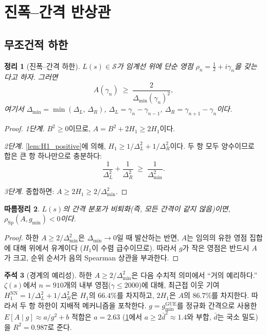 \documentclass[11pt,a4paper]{article}
\theoremstyle{plain}
\newtheorem{theorem}{정리}[section]
\newtheorem{corollary}[theorem]{따름정리}
\theoremstyle{definition}
\newtheorem{remark}[theorem]{주석}
\begin{document}
\section{진폭--간격 반상관}
\label{sec:theorem}

\subsection{무조건적 하한}

\begin{theorem}[진폭--간격 하한]\label{thm:lower_bound}
$L(s) \in \mathcal{S}$가 임계선 위에 단순 영점
$\rho_n = \tfrac{1}{2} + i\gamma_n$을 갖는다고 하자. 그러면
\begin{equation}\label{eq:lower_bound}
  A(\gamma_n) \;\ge\; \frac{2}{\Delta_{\min}(\gamma_n)^2},
\end{equation}
여기서 $\Delta_{\min} = \min(\Delta_L,\,\Delta_R)$,
$\Delta_L = \gamma_n - \gamma_{n-1}$, $\Delta_R = \gamma_{n+1} - \gamma_n$이다.
\end{theorem}

\begin{proof}
\textit{1단계.}\;
$B^2 \ge 0$이므로,
$A = B^2 + 2H_1 \ge 2H_1$이다.

\smallskip\noindent\textit{2단계.}\;
\cref{lem:H1_positive}에 의해,
$H_1 \ge 1/\Delta_L^2 + 1/\Delta_R^2$이다.
두 항 모두 양수이므로 합은 큰 항 하나만으로 충분하다:
\[
  \frac{1}{\Delta_L^2} + \frac{1}{\Delta_R^2}
  \;\ge\; \frac{1}{\Delta_{\min}^2}.
\]

\smallskip\noindent\textit{3단계.}\;
종합하면: $A \ge 2H_1 \ge 2/\Delta_{\min}^2$.
\end{proof}

\begin{corollary}\label{cor:anticorrelation}
$L(s)$의 간격 분포가 비퇴화(즉, 모든 간격이 같지 않음)이면,
$\rho_{\mathrm{Sp}}(A, g_{\min}) < 0$이다.
\end{corollary}

\begin{proof}
하한 $A \ge 2/\Delta_{\min}^2$은 $\Delta_{\min} \to 0$일 때 발산하는 반면,
$A$는 임의의 유한 영점 집합에 대해 위에서 유계이다
($H_1$이 수렴 급수이므로).
따라서 $g$가 작은 영점은 반드시 $A$가 크고,
순위 순서가 음의 Spearman 상관을 부과한다.
\end{proof}

\begin{remark}[경계의 예리성]\label{rem:tightness}
하한 $A \ge 2/\Delta_{\min}^2$은 다음 수치적 의미에서 ``거의 예리하다.''
$\zeta(s)$에서 $n = 910$개의 내부 영점($\gamma \le 2000$)에 대해,
최근접 이웃 기여
$H_1^{\mathrm{NN}} = 1/\Delta_L^2 + 1/\Delta_R^2$은
$H_1$의 $66.4\%$를 차지하고, $2H_1$은 $A$의 $86.7\%$를 차지한다.
따라서 두 항 하한이 지배적 메커니즘을 포착한다.
$g = g_{\min}^{\mathrm{GUE}}$를 정규화 간격으로 사용한
$E[A \mid g] \approx a/g^2 + b$ 적합은 $a = 2.63$
(\cref{thm:lower_bound}에서 $a \ge 2\bar{d}^2 \approx 1.4$와 부합,
$\bar{d}$는 국소 밀도)을 $R^2 = 0.987$로 준다.
\end{remark}
\end{document}
